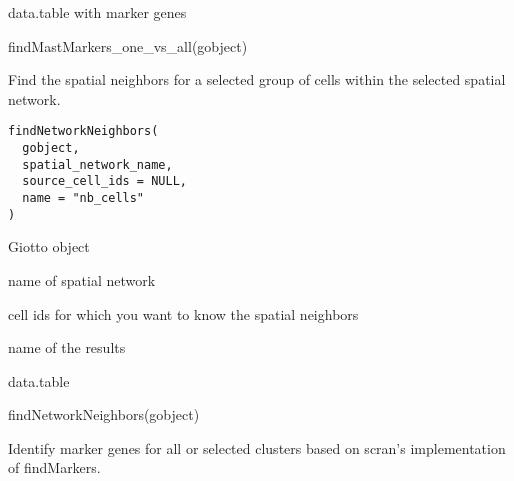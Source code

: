 \documentclass[a4paper]{book}
\begin{document}
%
\begin{Value}
data.table with marker genes
\end{Value}
%
\begin{SeeAlso}\relax
{}
\end{SeeAlso}
%
\begin{Examples}
\begin{ExampleCode}
    findMastMarkers_one_vs_all(gobject)
\end{ExampleCode}
\end{Examples}
%
\begin{Description}\relax
Find the spatial neighbors for a selected group of cells within the selected spatial network.
\end{Description}
%
\begin{Usage}
\begin{verbatim}
findNetworkNeighbors(
  gobject,
  spatial_network_name,
  source_cell_ids = NULL,
  name = "nb_cells"
)
\end{verbatim}
\end{Usage}
%
\begin{Arguments}
\begin{ldescription}
\item[\code{gobject}] Giotto object

\item[\code{spatial\_network\_name}] name of spatial network

\item[\code{source\_cell\_ids}] cell ids for which you want to know the spatial neighbors

\item[\code{name}] name of the results
\end{ldescription}
\end{Arguments}
%
\begin{Value}
data.table
\end{Value}
%
\begin{Examples}
\begin{ExampleCode}
    findNetworkNeighbors(gobject)
\end{ExampleCode}
\end{Examples}
%
\begin{Description}\relax
Identify marker genes for all or selected clusters based on scran's implementation of findMarkers.
\end{Description}
\end{document}
